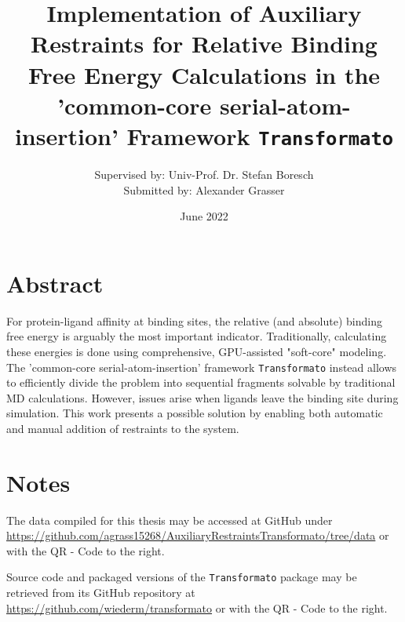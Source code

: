\documentclass[oneside]{scrreprt}
\title{Implementation of Auxiliary Restraints for Relative Binding Free Energy Calculations in the 'common-core serial-atom-insertion' Framework \texttt{Transformato}}
\author{Supervised by: Univ-Prof. Dr. Stefan Boresch\\Submitted by: \hspace{26mm}Alexander Grasser}
\date{June 2022}
\begin{document}
\begin{titlepage}

\maketitle{}
\end{titlepage}
\section*{Abstract}
    
    For protein-ligand affinity at binding sites, the relative (and absolute) binding free energy is arguably the most important indicator. Traditionally, calculating these energies is done using comprehensive, GPU-assisted "soft-core" modeling. The 'common-core serial-atom-insertion' framework \texttt{Transformato} instead allows to efficiently divide the problem into sequential fragments solvable by traditional MD calculations. However, issues arise when ligands leave the binding site during simulation. This work presents a possible solution by enabling both automatic and manual addition of restraints to the system.
\vspace{\fill}
\section*{Notes}
\noindent\begin{minipage}{0.7\textwidth}
The data compiled for this thesis may be accessed at GitHub under \url{https://github.com/agrass15268/AuxiliaryRestraintsTransformato/tree/data} or with the QR - Code to the right.
\end{minipage}
\hspace{0.1\textwidth}
\begin{minipage}{0.2\textwidth}

\end{minipage}
 
\vspace{1cm}

\noindent\begin{minipage}{0.7\textwidth}
Source code and packaged versions of the \texttt{Transformato} package may be retrieved from its GitHub repository at  \url{https://github.com/wiederm/transformato} or with the QR - Code to the right.
\end{minipage}
\hspace{0.1\textwidth}
\begin{minipage}{0.2\textwidth}

\end{minipage}
\newpage
\end{document}
